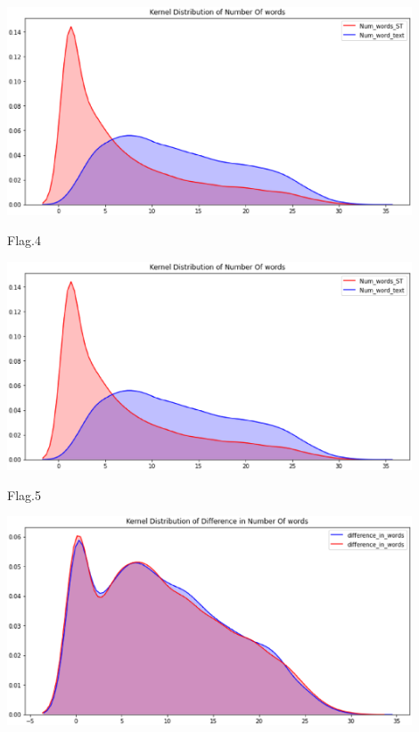 \begin{center}
  \begin{minipage}{0.4\linewidth}
  \centering

  \includegraphics[width=0.9\textwidth]{kaggle/1.1.eps}
 
  {\small{Flag.4}}

  \end{minipage}
  \begin{minipage}{0.4\linewidth}
    \centering
  
    \includegraphics[width=0.9\textwidth]{kaggle/1.2.eps}
   
    {\small{Flag.5}}
  
    \end{minipage}
    \begin{minipage}{0.4\linewidth}
      \centering
    
      \includegraphics[width=0.9\textwidth]{kaggle/1.3.eps}
     

\end{minipage}
\end{center}
